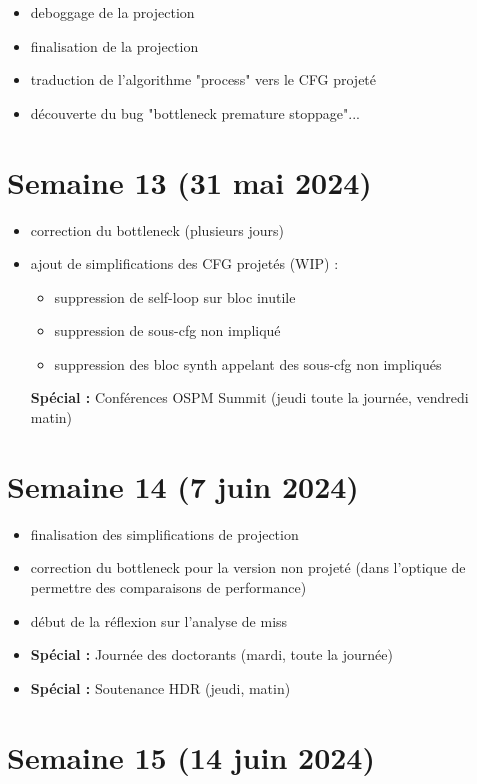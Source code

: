 \documentclass[a4paper,12pt]{article}
\begin{document}
\begin{itemize}
  \item deboggage de la projection
  \item finalisation de la projection
  \item traduction de l'algorithme "process" vers le CFG projeté
  \item découverte du bug "bottleneck premature stoppage"...
\end{itemize}

\section{Semaine 13 (31 mai 2024)}

\begin{itemize}
  \item correction du bottleneck (plusieurs jours)
  \item ajout de simplifications des CFG projetés (WIP) :
  \begin{itemize}
    \item suppression de self-loop sur bloc inutile
    \item suppression de sous-cfg non impliqué
    \item suppression des bloc synth appelant des sous-cfg non impliqués
  \end{itemize}
  \textbf{Spécial :} Conférences OSPM Summit (jeudi toute la journée, vendredi matin)
\end{itemize}

\section{Semaine 14 (7 juin 2024)}

\begin{itemize}
  \item finalisation des simplifications de projection
  \item correction du bottleneck pour la version non projeté (dans l'optique de permettre des comparaisons de performance)
  \item début de la réflexion sur l'analyse de miss
  \item \textbf{Spécial :} Journée des doctorants (mardi, toute la journée)
  \item \textbf{Spécial :} Soutenance HDR (jeudi, matin)
\end{itemize}

\section{Semaine 15 (14 juin 2024)}
\end{document}
